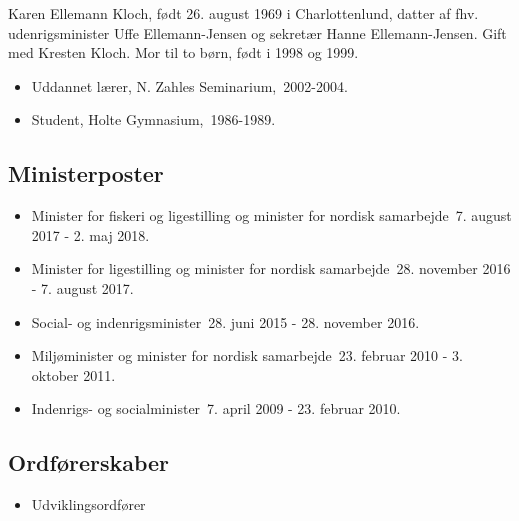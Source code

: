 \documentclass[11pt, a4paper]{awesome-cv}
\begin{document}
\makecvheader[R]
\makelettertitle
\begin{cvletter}
Karen Ellemann Kloch, født 26. august 1969 i Charlottenlund, datter af fhv. udenrigsminister Uffe Ellemann-Jensen og sekretær Hanne Ellemann-Jensen. Gift med Kresten Kloch. Mor til to børn, født i 1998 og 1999.

\begin{itemize}
\item Uddannet lærer, N. Zahles Seminarium, 2002-2004.
\item Student, Holte Gymnasium, 1986-1989.
\end{itemize}
\subsection*{Ministerposter}
\begin{itemize}
\item Minister for fiskeri og ligestilling og minister for nordisk samarbejde 7. august 2017 - 2. maj 2018.
\item Minister for ligestilling og minister for nordisk samarbejde 28. november 2016 - 7. august 2017.
\item Social- og indenrigsminister 28. juni 2015 - 28. november 2016.
\item Miljøminister og minister for nordisk samarbejde 23. februar 2010 - 3. oktober 2011.
\item Indenrigs- og socialminister 7. april 2009 - 23. februar 2010.
\end{itemize}
\subsection*{Ordførerskaber}
\begin{itemize}
\item Udviklingsordfører
\end{itemize}

\end{cvletter}
\end{document}
